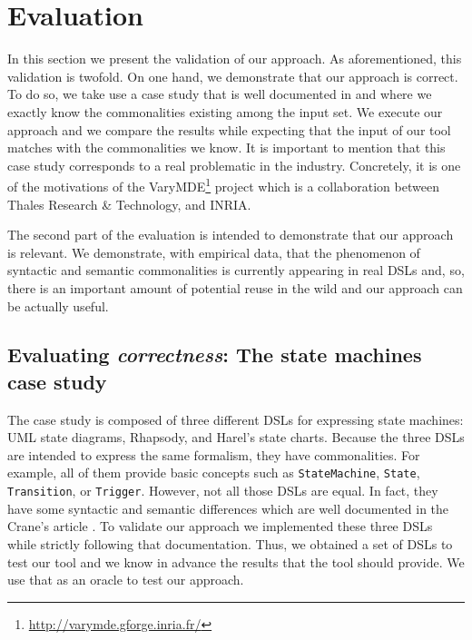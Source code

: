 \section{Evaluation}
\label{sec:validation}

In this section we present the validation of our approach. As aforementioned, this validation is twofold. On one hand, we demonstrate that our approach is correct. To do so, we take use a case study that is well documented in \cite{Crane:2007} and where we exactly know the commonalities existing among the input set. We execute our approach and we compare the results while expecting that the input of our tool matches with the commonalities we know. It is important to mention that this case study corresponds to a real problematic in the industry. Concretely, it is one of the motivations of the VaryMDE\footnote{\url{http://varymde.gforge.inria.fr/}} project which is a collaboration between Thales Research \& Technology, and INRIA.  

The second part of the evaluation is intended to demonstrate that our approach is relevant. We demonstrate, with empirical data, that the phenomenon of syntactic and semantic commonalities is currently appearing in real DSLs and, so, there is an important amount of potential reuse in the wild and our approach can be actually useful. 

\subsection{Evaluating \textit{correctness}: The state machines case study}

The case study is composed of three different DSLs for expressing state machines:  UML state diagrams, Rhapsody, and Harel's state charts. Because the three DSLs are intended to express the same formalism, they have commonalities. For example, all of them provide basic concepts such as \texttt{StateMachine}, \texttt{State}, \texttt{Transition}, or \texttt{Trigger}. However, not all those DSLs are equal. In fact, they have some syntactic and semantic differences which are well documented in the Crane's article \cite{Crane:2007}. To validate our approach we implemented these three DSLs while strictly following that documentation. Thus, we obtained a set of DSLs to test our tool and we know in advance the results that the tool should provide. We use that as an oracle to test our approach. 

